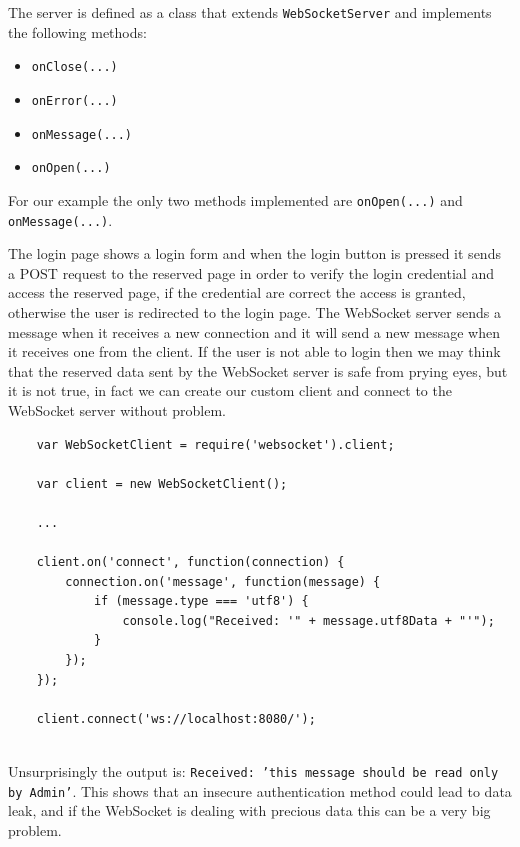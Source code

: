 	The server is defined as a class that extends \texttt{WebSocketServer} and implements the following methods:
	\begin{itemize}
		\item \texttt{onClose(...)}
		\item \texttt{onError(...)}
		\item \texttt{onMessage(...)}
		\item \texttt{onOpen(...)}
	\end{itemize}
	For our example the only two methods implemented are \texttt{onOpen(...)} and \texttt{onMessage(...)}.
	
	The login page shows a login form and when the login button is pressed it sends a POST request to the reserved page in order to verify the login credential and access the reserved page, if the credential are correct the access is granted, otherwise the user is redirected to the login page.\newline
	The WebSocket server sends a message when it receives a new connection and it will send a new message when it receives one from the client.\newline
	If the user is not able to login then we may think that the reserved data sent by the WebSocket server is safe from prying eyes, but it is not true, in fact we can create our custom client and connect to the WebSocket server without problem.\newline
	
	\begin{lstlisting}
	var WebSocketClient = require('websocket').client;
	
	var client = new WebSocketClient();
	
	...
	
	client.on('connect', function(connection) {
		connection.on('message', function(message) {
			if (message.type === 'utf8') {
				console.log("Received: '" + message.utf8Data + "'");
			}
		});
	});
	
	client.connect('ws://localhost:8080/');
	
	\end{lstlisting}
	
	Unsurprisingly the output is:
	\texttt{Received: 'this message should be read only by Admin'}.\newline
	This shows that an insecure authentication method could lead to data leak, and if the WebSocket is dealing with precious data this can be a very big problem.\newline
	
